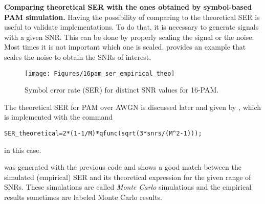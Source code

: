 \bApplication \textbf{Comparing theoretical SER with the ones obtained by symbol-based PAM simulation.}
Having the possibility of comparing to the theoretical SER is useful to validate implementations. To do that, it is necessary to generate signals with a given SNR. This can be done by properly scaling the signal or the noise. Most times it is not important which one is scaled.  provides an example that scales the noise to obtain the SNRs of interest.

\begin{figure}[htbp]
\centering
\texttt{[image: Figures/16pam\_ser\_empirical\_theo]}
\caption{Symbol error rate (SER) for distinct SNR values for 16-PAM.\label{fig:16pam_ser_empirical_theo}}
\end{figure}

The theoretical SER for PAM over AWGN is discussed later and given by , which is implemented with the command
\begin{lstlisting}
SER_theoretical=2*(1-1/M)*qfunc(sqrt(3*snrs/(M^2-1)));
\end{lstlisting}
in this case.

 was generated with the previous code and shows a good match between the simulated (empirical) SER and its theoretical expression  for the given range of SNRs. These simulations are called \emph{Monte Carlo} simulations and the empirical results sometimes are labeled Monte Carlo results.
\eApplication

